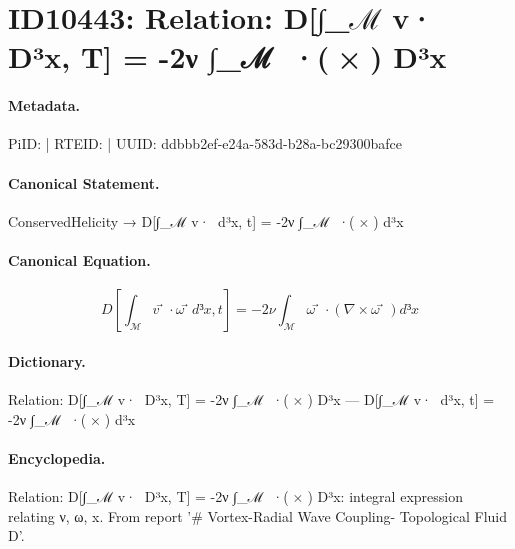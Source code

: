 \section*{ID10443: Relation: D[∫\_ℳ v⃗·ω⃗ D³x, T] = -2ν ∫\_ℳ ω⃗·(∇×ω⃗) D³x}
\paragraph{Metadata.}
PiID:  | RTEID:  | UUID: ddbbb2ef-e24a-583d-b28a-bc29300bafce

\paragraph{Canonical Statement.}
ConservedHelicity → D[∫\_ℳ v⃗·ω⃗ d³x, t] = -2ν ∫\_ℳ ω⃗·(∇×ω⃗) d³x

\paragraph{Canonical Equation.}
\[
D[∫_ℳ v⃗·ω⃗ d³x, t] = -2ν ∫_ℳ ω⃗·(∇×ω⃗) d³x
\]

\paragraph{Dictionary.}
Relation: D[∫\_ℳ v⃗·ω⃗ D³x, T] = -2ν ∫\_ℳ ω⃗·(∇×ω⃗) D³x — D[∫\_ℳ v⃗·ω⃗ d³x, t] = -2ν ∫\_ℳ ω⃗·(∇×ω⃗) d³x

\paragraph{Encyclopedia.}
Relation: D[∫\_ℳ v⃗·ω⃗ D³x, T] = -2ν ∫\_ℳ ω⃗·(∇×ω⃗) D³x: integral expression relating ν, ω, x. From report '\# Vortex-Radial Wave Coupling- Topological Fluid D'.
